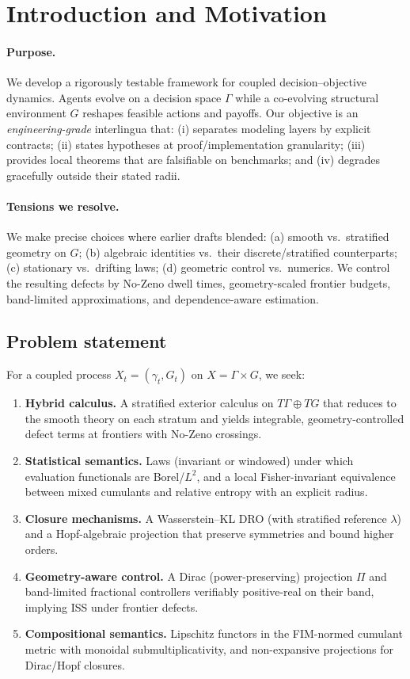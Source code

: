 \section{Introduction and Motivation}\label{sec:intro1}

\paragraph{Purpose.}
We develop a rigorously testable framework for coupled decision--objective dynamics. Agents evolve on a decision space $\Gamma$ while a co-evolving structural environment $G$ reshapes feasible actions and payoffs. Our objective is an \emph{engineering-grade} interlingua that: (i) separates modeling layers by explicit contracts; (ii) states hypotheses at proof/implementation granularity; (iii) provides local theorems that are falsifiable on benchmarks; and (iv) degrades gracefully outside their stated radii.

\paragraph{Tensions we resolve.}
We make precise choices where earlier drafts blended: (a) smooth vs.\ stratified geometry on $G$; (b) algebraic identities vs.\ their discrete/stratified counterparts; (c) stationary vs.\ drifting laws; (d) geometric control vs.\ numerics. We control the resulting defects by No-Zeno dwell times, geometry-scaled frontier budgets, band-limited approximations, and dependence-aware estimation.

\subsection*{Problem statement}
For a coupled process $X_t=(\gamma_t,G_t)$ on $X=\Gamma\times G$, we seek:

\begin{enumerate}[label=(P\arabic*),leftmargin=*]
\item \textbf{Hybrid calculus.} A stratified exterior calculus on $T\Gamma\oplus TG$ that reduces to the smooth theory on each stratum and yields integrable, geometry-controlled defect terms at frontiers with No-Zeno crossings.
\item \textbf{Statistical semantics.} Laws (invariant or windowed) under which evaluation functionals are Borel/$L^2$, and a local Fisher-invariant equivalence between mixed cumulants and relative entropy with an explicit radius.
\item \textbf{Closure mechanisms.} A Wasserstein--KL DRO (with stratified reference $\lambda$) and a Hopf-algebraic projection that preserve symmetries and bound higher orders.
\item \textbf{Geometry-aware control.} A Dirac (power-preserving) projection $\Pi$ and band-limited fractional controllers verifiably positive-real on their band, implying ISS under frontier defects.
\item \textbf{Compositional semantics.} Lipschitz functors in the FIM-normed cumulant metric with monoidal submultiplicativity, and non-expansive projections for Dirac/Hopf closures.
\end{enumerate}

